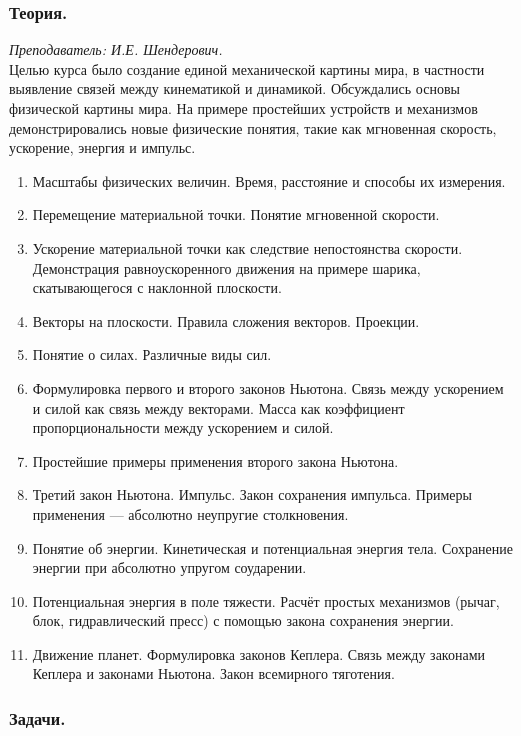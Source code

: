 \documentclass[12pt]{article}
\newlength{\h}
\newlength{\x}
\begin{document}
\subsubsection{Теория.}
\label{sec:daily8th}

\textit{Преподаватель: И.Е. Шендерович.}\\

Целью курса было создание единой механической картины мира, в
частности выявление связей между кинематикой и динамикой. Обсуждались
основы физической картины мира. На примере простейших устройств и
механизмов демонстрировались новые физические понятия, такие как
мгновенная скорость, ускорение, энергия и импульс.

\begin{enumerate}
\item Масштабы физических величин. Время, расстояние и способы их
  измерения. 
\item Перемещение материальной точки. Понятие мгновенной скорости.
\item Ускорение материальной точки как следствие непостоянства
  скорости. Демонстрация равноускоренного движения на примере
  шарика, скатывающегося с наклонной плоскости.
\item Векторы на плоскости. Правила сложения векторов. Проекции.
\item Понятие о силах. Различные виды сил.
\item Формулировка первого и второго законов Ньютона. Связь между
  ускорением и силой как связь между векторами. Масса как коэффициент
  пропорциональности между ускорением и силой. 
\item Простейшие примеры применения второго закона Ньютона.
\item Третий закон Ньютона. Импульс. Закон сохранения
  импульса. Примеры применения --- абсолютно неупругие столкновения.
\item Понятие об энергии. Кинетическая и потенциальная энергия
  тела. Сохранение энергии при абсолютно упругом соударении.
\item Потенциальная энергия в поле тяжести. Расчёт простых механизмов
  (рычаг, блок, гидравлический пресс) с помощью закона сохранения
  энергии.
\item Движение планет. Формулировка законов Кеплера. Связь между
  законами Кеплера и законами Ньютона. Закон всемирного тяготения. 
\end{enumerate}

\subsubsection{Задачи.}
\label{sec:daily8pr}
\end{document}

